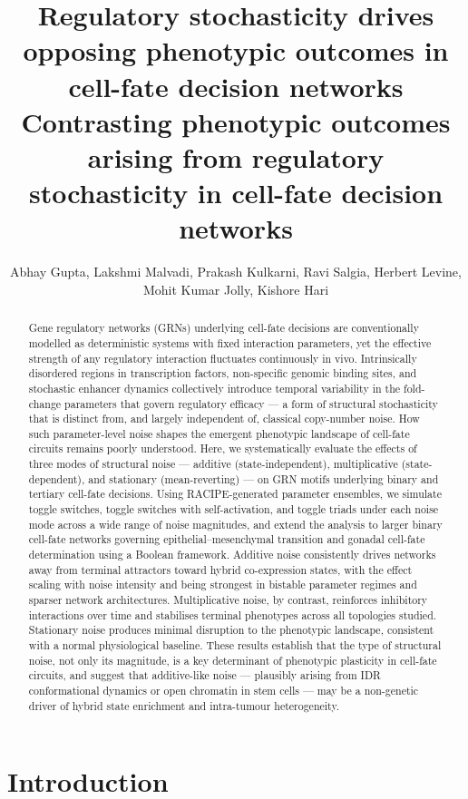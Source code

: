 \documentclass[11pt]{article}
\title{Regulatory stochasticity drives opposing phenotypic outcomes in cell-fate decision networks\\
\vspace{5pt}
Contrasting phenotypic outcomes arising from regulatory stochasticity in cell-fate decision networks\\
}
\author{Abhay Gupta, Lakshmi Malvadi, Prakash Kulkarni, Ravi Salgia, Herbert Levine, \\ Mohit Kumar Jolly, Kishore Hari}
\begin{document}
\maketitle

\begin{abstract}
Gene regulatory networks (GRNs) underlying cell-fate decisions are conventionally modelled as deterministic systems with fixed interaction parameters, yet the effective strength of any regulatory interaction fluctuates continuously in vivo. Intrinsically disordered regions in transcription factors, non-specific genomic binding sites, and stochastic enhancer dynamics collectively introduce temporal variability in the fold-change parameters that govern regulatory efficacy --- a form of structural stochasticity that is distinct from, and largely independent of, classical copy-number noise. How such parameter-level noise shapes the emergent phenotypic landscape of cell-fate circuits remains poorly understood. Here, we systematically evaluate the effects of three modes of structural noise --- additive (state-independent), multiplicative (state-dependent), and stationary (mean-reverting) --- on GRN motifs underlying binary and tertiary cell-fate decisions. Using RACIPE-generated parameter ensembles, we simulate toggle switches, toggle switches with self-activation, and toggle triads under each noise mode across a wide range of noise magnitudes, and extend the analysis to larger binary cell-fate networks governing epithelial--mesenchymal transition and gonadal cell-fate determination using a Boolean framework. Additive noise consistently drives networks away from terminal attractors toward hybrid co-expression states, with the effect scaling with noise intensity and being strongest in bistable parameter regimes and sparser network architectures. Multiplicative noise, by contrast, reinforces inhibitory interactions over time and stabilises terminal phenotypes across all topologies studied. Stationary noise produces minimal disruption to the phenotypic landscape, consistent with a normal physiological baseline. These results establish that the type of structural noise, not only its magnitude, is a key determinant of phenotypic plasticity in cell-fate circuits, and suggest that additive-like noise --- plausibly arising from IDR conformational dynamics or open chromatin in stem cells --- may be a non-genetic driver of hybrid state enrichment and intra-tumour heterogeneity.
\end{abstract}

\section{Introduction}\label{sec:Intro}
\end{document}
